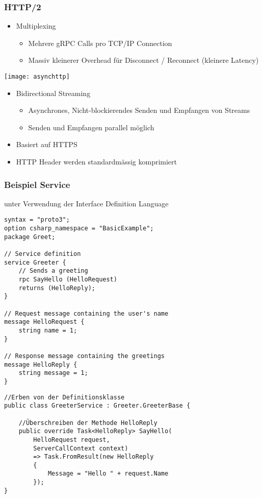 \begin{multicols*}{2}
\subsubsection{HTTP/2}
\begin{itemize}
    \item Multiplexing
    \begin{itemize}
        \item Mehrere gRPC Calls pro TCP/IP Connection
        \item Massiv kleinerer Overhead für Disconnect / Reconnect (kleinere Latency)
    \end{itemize}
\end{itemize}
\texttt{[image: asynchttp]}
\begin{itemize}
    \item Bidirectional Streaming
    \begin{itemize}
        \item Asynchrones, Nicht-blockierendes Senden und Empfangen von Streams
        \item Senden und Empfangen parallel möglich
    \end{itemize}
    \item Basiert auf HTTPS
    \item HTTP Header werden standardmässig komprimiert
\end{itemize}
\subsubsection{Beispiel Service}
 unter Verwendung der Interface Definition Language
\begin{lstlisting}
syntax = "proto3";
option csharp_namespace = "BasicExample"; 
package Greet;

// Service definition
service Greeter {
    // Sends a greeting
    rpc SayHello (HelloRequest)
    returns (HelloReply);
}

// Request message containing the user's name
message HelloRequest {
    string name = 1;
}

// Response message containing the greetings
message HelloReply {
    string message = 1;
}
\end{lstlisting}
\begin{lstlisting}
//Erben von der Definitionsklasse
public class GreeterService : Greeter.GreeterBase {

    //Überschreiben der Methode HelloReply
    public override Task<HelloReply> SayHello(
        HelloRequest request, 
        ServerCallContext context)
        => Task.FromResult(new HelloReply
        {
            Message = "Hello " + request.Name
        });
}
\end{lstlisting}

\end{multicols*}
